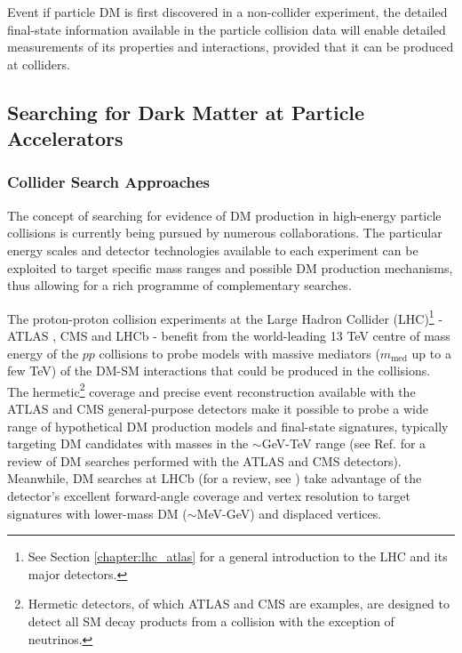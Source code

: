 Event if particle DM is first discovered in a non-collider experiment, the detailed final-state information available in the particle collision data will enable detailed measurements of its properties and interactions, provided that it can be produced at colliders.

\subsection{Searching for Dark Matter at Particle Accelerators}

\subsubsection{Collider Search Approaches}

The concept of searching for evidence of DM production in high-energy particle collisions is currently being pursued by numerous collaborations. The particular energy scales and detector technologies available to each experiment can be exploited to target specific mass ranges and possible DM production mechanisms, thus allowing for a rich programme of complementary searches.

The proton-proton collision experiments at the Large Hadron Collider (LHC)\footnote{See Section \ref{chapter:lhc_atlas} for a general introduction to the LHC and its major detectors.} \cite{lhc_machine} - ATLAS \cite{atlas}, CMS \cite{cms} and LHCb \cite{LHCb} - benefit from the world-leading 13 TeV centre of mass energy of the \(pp\) collisions to probe models with massive mediators (\(m_\text{med}\) up to a few TeV) of the DM-SM interactions that could be produced in the collisions. The hermetic\footnote{Hermetic detectors, of which ATLAS and CMS are examples, are designed to detect all SM decay products from a collision with the exception of neutrinos.} coverage and precise event reconstruction available with the ATLAS and CMS general-purpose detectors make it possible to probe a wide range of hypothetical DM production models and final-state signatures, typically targeting DM candidates with masses in the \(\sim\)GeV-TeV range (see Ref. \cite{Trevisani:2018psx} for a review of DM searches performed with the ATLAS and CMS detectors). Meanwhile, DM searches at LHCb (for a review, see \cite{mombacher2021dark}) take advantage of the detector's excellent forward-angle coverage and vertex resolution to target signatures with lower-mass DM (\(\sim\)MeV-GeV) and displaced vertices.

